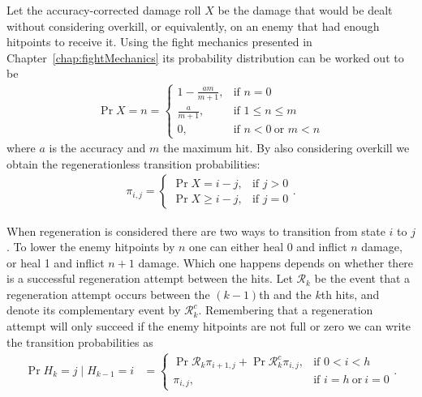 Let the accuracy-corrected damage roll $X$ be the damage that would be dealt without considering overkill, or equivalently, on an enemy that had enough hitpoints to receive it. Using the fight mechanics presented in Chapter~\ref{chap:fightMechanics} its probability distribution can be worked out to be
\begin{align}
	\Pr{X=n} = \begin{cases}
		1 - \frac{am}{m+1}, &\mbox{if } n = 0 \\
		\frac{a}{m+1},      &\mbox{if } 1 \leq n \leq m\\
		0,      			&\mbox{if } n < 0\ \mbox{or } m < n
	\end{cases}\label{eq:damageRollDistribution}
\end{align}
where $a$ is the accuracy and $m$ the maximum hit. By also considering overkill we obtain the regenerationless transition probabilities:
\begin{align}
	\pi_{i,j} = \begin{cases}
		\Pr{X = i-j}, &\mbox{if } j > 0 \\
		\Pr{X \geq i-j}, &\mbox{if } j = 0
	\end{cases}\label{eq:noregenTransitionProbabilities}.
\end{align}

When regeneration is considered there are two ways to transition from state $i$ to $j$. To lower the enemy hitpoints by $n$ one can either heal 0 and inflict $n$ damage, or heal 1 and inflict $n+1$ damage. Which one happens depends on whether there is a successful regeneration attempt between the hits. Let $\mathcal{R}_k$ be the event that a regeneration attempt occurs between the $(k-1)$th and the $k$th hits, and denote its complementary event by $\mathcal{R}_k^c$. Remembering that a regeneration attempt will only succeed if the enemy hitpoints are not full or zero we can write the transition probabilities as
\begin{align}
	\Pr{H_k = j \mid H_{k-1} = i} &= \begin{cases}
		\Pr{\mathcal{R}_k}\pi_{i+1,j} + \Pr{\mathcal{R}_k^c}\pi_{i,j},&\mbox{if } 0<i<h\\
		\pi_{i,j},&\mbox{if } i=h\ \mbox{or}\ i=0
	\end{cases}.
\end{align}

